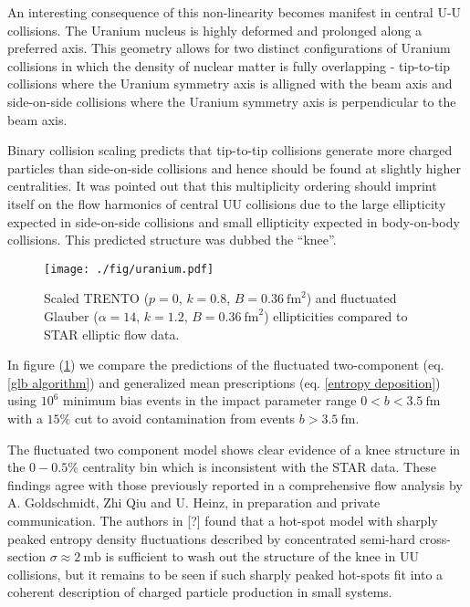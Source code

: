 \documentclass[aps,prl,reprint,amsmath,nofootinbib]{revtex4-1}
\begin{document}
An interesting consequence of this non-linearity becomes manifest in central U-U collisions. The Uranium nucleus is highly deformed and prolonged along a preferred
axis. This geometry allows for two distinct configurations of Uranium collisions in which the density of nuclear matter is fully overlapping - tip-to-tip collisions
where the Uranium symmetry axis is alligned with the beam axis and side-on-side collisions where the Uranium symmetry axis is perpendicular to the beam axis.

Binary collision scaling predicts that tip-to-tip collisions generate more charged particles than side-on-side collisions and hence should be found at slightly
higher centralities. It was pointed out that this multiplicity ordering should imprint itself on the flow harmonics of central UU collisions due to the large 
ellipticity expected in side-on-side collisions and small ellipticity expected in body-on-body collisions. This predicted structure was dubbed the ``knee''.

\begin{figure}
 \centering
 \texttt{[image: ./fig/uranium.pdf]}
 \caption{\label{fig:knee} Scaled TRENTO ($p=0$, $k=0.8$, $B=0.36~\mathrm{fm}^2$) and fluctuated Glauber ($\alpha=14$, $k=1.2$, $B=0.36~\mathrm{fm}^2$) ellipticities
 compared to STAR elliptic flow data.}
\end{figure}

In figure (\ref{fig:knee}) we compare the predictions of the fluctuated two-component (eq. \ref{glb algorithm}) and generalized mean prescriptions
(eq. \ref{entropy deposition}) using $10^6$ minimum bias events in the impact parameter range $0<b<3.5 ~\mathrm{fm}$ with a $15\%$ cut to avoid 
contamination from events $b>3.5 ~\mathrm{fm}$.

The fluctuated two component model shows clear evidence of a knee structure in the $0-0.5\%$ centrality bin which is inconsistent with the STAR data. These findings agree 
with those previously reported in a comprehensive flow analysis by A. Goldschmidt, Zhi Qiu and U. Heinz, in preparation and private communication. The authors in [?] 
found that a hot-spot model with sharply peaked entropy density fluctuations described by concentrated semi-hard cross-section $\sigma \approx 2 ~\mathrm{mb}$ is sufficient to wash 
out the structure of the knee in UU collisions, but it remains to be seen if such sharply peaked hot-spots fit into a coherent description of charged particle production in 
small systems.
\end{document}
